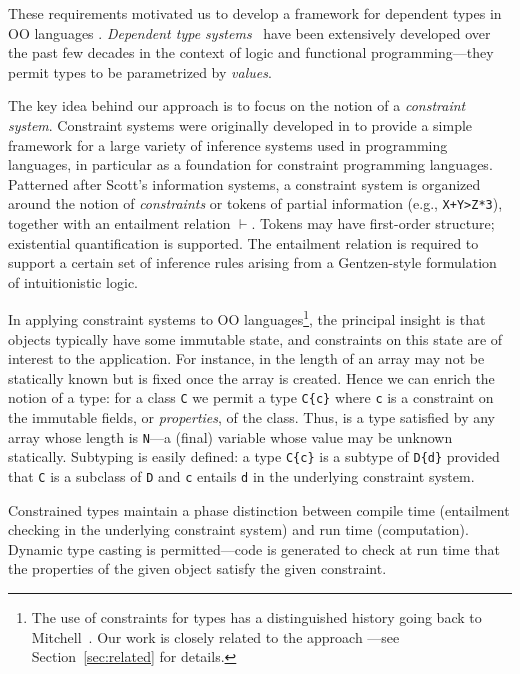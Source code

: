 These requirements motivated us to develop a framework for dependent
types in OO languages \cite{constrained-types}.  {\em Dependent type
systems}~\cite{dependent-types,xi99dependent,ocrz-ecoop03,aspinall-attapl,cayenne,epigram-matter,calc-constructions}
have been extensively developed over the past few decades in the
context of logic and functional programming---they permit types to be
parametrized by {\em values}.

The key idea behind our approach is to focus on the notion of a {\em
constraint system}. Constraint systems were originally developed in
\cite{cccc} to provide a simple framework for a large variety of
inference systems used in programming languages, in particular as a
foundation for constraint programming languages.  Patterned after
Scott's information systems, a constraint system is
organized around the notion of {\em constraints} or tokens of partial
information (e.g., {\tt X+Y>Z*3}), together with an entailment
relation $\vdash$.  Tokens may have first-order structure; existential
quantification is supported. The entailment relation is required to
support a certain set of inference rules arising from a Gentzen-style
formulation of intuitionistic logic.

In applying constraint systems to OO languages\footnote{The use of constraints for types has a distinguished
history going back to Mitchell~\cite{mitchell84}. Our work is closely related to the \hmx{}
approach \cite{sulzmann97type}---see Section~\ref{sec:related} for details.}, the principal insight
is that objects typically have some immutable state, and constraints on
this state are of interest to the application.  For instance, in \Java{}
the length of an array may not be statically known but is fixed once
the array is created. Hence we can enrich the notion of a type: for a
class {\tt C} we permit a type {\tt C\{c\}} where {\tt c} is a
constraint on the immutable fields, or {\em properties}, of the class. Thus, 
 is a type satisfied by any array whose length
is {\tt N}---a (final) variable whose value may be unknown
statically. Subtyping is easily defined: a type {\tt C\{c\}} is a
subtype of {\tt D\{d\}} 
provided that {\tt C} is a subclass of {\tt D} and {\tt c}
entails {\tt d} in the underlying constraint system.

Constrained types maintain a phase distinction between compile time
(entailment checking in the underlying constraint system) and run time
(computation).  Dynamic type casting is permitted---code is generated
to check at run time that the properties of the given object satisfy
the given constraint.

